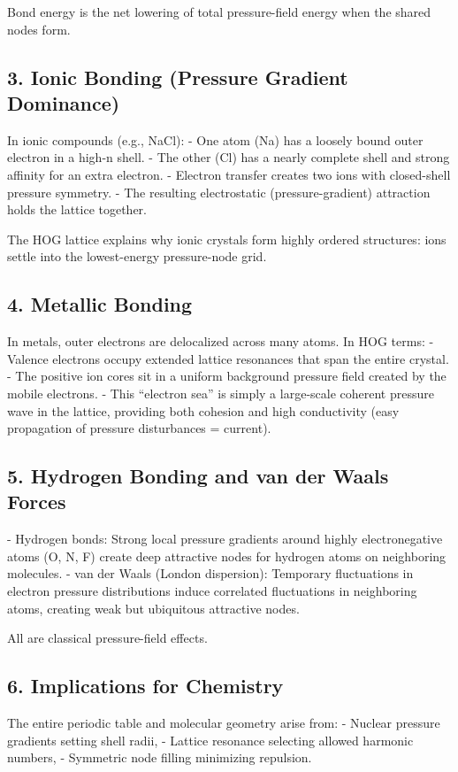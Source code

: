 \documentclass[11pt,a4paper]{book}
\begin{document}
{Bond energy is the net lowering of total pressure-field energy when the shared nodes form.

\subsection{3. Ionic Bonding (Pressure Gradient Dominance)}
In ionic compounds (e.g., NaCl):
- One atom (Na) has a loosely bound outer electron in a high-n shell.
- The other (Cl) has a nearly complete shell and strong affinity for an extra electron.
- Electron transfer creates two ions with closed-shell pressure symmetry.
- The resulting electrostatic (pressure-gradient) attraction holds the lattice together.

The HOG lattice explains why ionic crystals form highly ordered structures: ions settle into the lowest-energy pressure-node grid.

\subsection{4. Metallic Bonding}
In metals, outer electrons are delocalized across many atoms. In HOG terms:
- Valence electrons occupy extended lattice resonances that span the entire crystal.
- The positive ion cores sit in a uniform background pressure field created by the mobile electrons.
- This “electron sea” is simply a large-scale coherent pressure wave in the lattice, providing both cohesion and high conductivity (easy propagation of pressure disturbances = current).

\subsection{5. Hydrogen Bonding and van der Waals Forces}
- Hydrogen bonds: Strong local pressure gradients around highly electronegative atoms (O, N, F) create deep attractive nodes for hydrogen atoms on neighboring molecules.
- van der Waals (London dispersion): Temporary fluctuations in electron pressure distributions induce correlated fluctuations in neighboring atoms, creating weak but ubiquitous attractive nodes.

All are classical pressure-field effects.

\subsection{6. Implications for Chemistry}
The entire periodic table and molecular geometry arise from:
- Nuclear pressure gradients setting shell radii,
- Lattice resonance selecting allowed harmonic numbers,
- Symmetric node filling minimizing repulsion.

}
\end{document}

